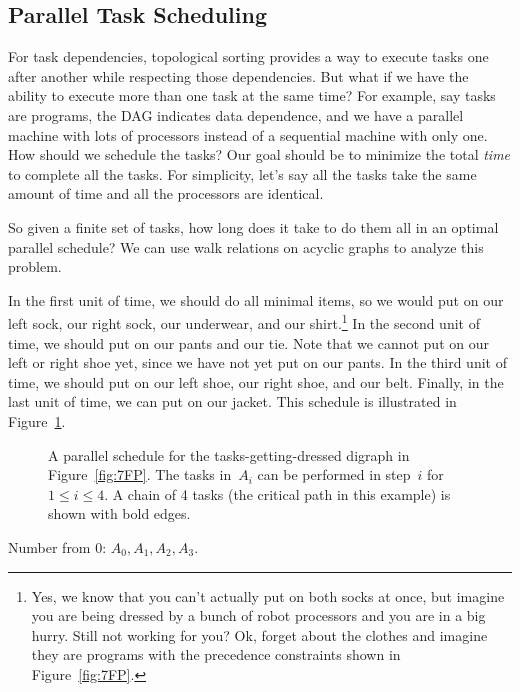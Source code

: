 \subsection{Parallel Task Scheduling}\label{parallel_sec}

For task dependencies, topological sorting provides a way to execute
tasks one after another while respecting those dependencies.  But what
if we have the ability to execute more than one task at the same time?
For example, say tasks are programs, the DAG indicates data
dependence, and we have a parallel machine with lots of processors
instead of a sequential machine with only one.  How should we schedule
the tasks?  Our goal should be to minimize the total \emph{time} to
complete all the tasks.  For simplicity, let's say all the tasks take
the same amount of time and all the processors are identical.

So given a finite set of tasks, how long does it take to do them all
in an optimal parallel schedule?  We can use walk relations on
acyclic graphs to analyze this problem.

In the first unit of time, we should do all minimal items, so we would
put on our left sock, our right sock, our underwear, and our
shirt.\footnote{Yes, we know that you can't actually put on both socks
  at once, but imagine you are being dressed by a bunch of robot
  processors and you are in a big hurry.  Still not working for you?
  Ok, forget about the clothes and imagine they are programs with the
  precedence constraints shown in Figure~\ref{fig:7FP}.}  In the
second unit of time, we should put on our pants and our tie.  Note
that we cannot put on our left or right shoe yet, since we have not
yet put on our pants.  In the third unit of time, we should put on our
left shoe, our right shoe, and our belt.  Finally, in the last unit of
time, we can put on our jacket.  This schedule is illustrated in
Figure~\ref{fig:7FS}.

\begin{figure}


\caption{A parallel schedule for the tasks-getting-dressed digraph in
Figure~\ref{fig:7FP}.  The tasks in~$A_i$ can be performed in step~$i$
for $1 \le i \le 4$.  A chain of 4 tasks (the critical path in this
example) is shown with bold edges.}

\label{fig:7FS}

\end{figure}

\begin{editingnotes}
Number from 0: $A_0, A_1, A_2, A_3$.
\end{editingnotes}

